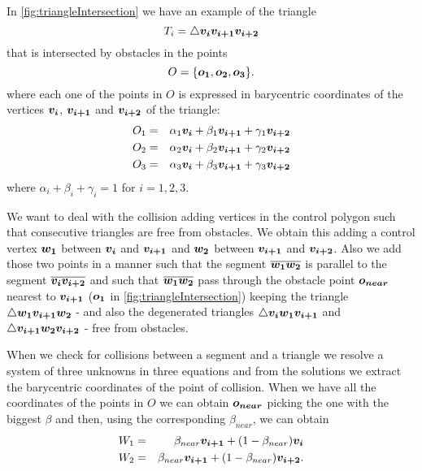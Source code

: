 \documentclass[dissertation.tex]{subfiles}
\begin{document}
In \cref{fig:triangleIntersection} we have an example of the triangle
\begin{equation*}
  T_i = \triangle \boldsymbol{v_i}\boldsymbol{v_{i+1}}\boldsymbol{v_{i+2}} 
\end{equation*}
that is
intersected by obstacles in the points
\begin{equation*}
  O = \{\boldsymbol{o_1},\boldsymbol{o_2},\boldsymbol{o_3}\}.
\end{equation*}
where each one of the points in $O$ is expressed in barycentric
coordinates of the vertices $\boldsymbol{v_i}$, $\boldsymbol{v_{i+1}}$ and $\boldsymbol{v_{i+2}}$ of the
triangle:
\begin{eqnarray*}
  O_1&=&\alpha_1 \boldsymbol{v_i}+\beta_1 \boldsymbol{v_{i+1}}+\gamma_1 \boldsymbol{v_{i+2}}\\
  O_2&=&\alpha_2 \boldsymbol{v_i}+\beta_2 \boldsymbol{v_{i+1}}+\gamma_2 \boldsymbol{v_{i+2}}\\
  O_3&=&\alpha_3 \boldsymbol{v_i}+\beta_3 \boldsymbol{v_{i+1}}+\gamma_3 \boldsymbol{v_{i+2}}
\end{eqnarray*}
where $\alpha_i+\beta_i+\gamma_i=1$ for $i=1,2,3$.

We want to deal with the collision adding vertices in the control
polygon such that consecutive triangles are free from obstacles. We
obtain this adding a control vertex $\boldsymbol{w_1}$ between $\boldsymbol{v_i}$ and $\boldsymbol{v_{i+1}}$
and $\boldsymbol{w_2}$ between $\boldsymbol{v_{i+1}}$ and $\boldsymbol{v_{i+2}}$. Also we add those two
points in a manner such that the segment $\overline{\boldsymbol{w_1}\boldsymbol{w_2}}$ is
parallel to the segment $\overline{\boldsymbol{v_i}\boldsymbol{v_{i+2}}}$ and such that
$\overline{\boldsymbol{w_1}\boldsymbol{w_2}}$ pass through the obstacle point $\boldsymbol{o_{near}}$ nearest
to $\boldsymbol{v_{i+1}}$ ($\boldsymbol{o_1}$ in \cref{fig:triangleIntersection}) keeping the
triangle $\triangle \boldsymbol{w_1}\boldsymbol{v_{i+1}}\boldsymbol{w_2}$ - and also
the degenerated triangles $\triangle \boldsymbol{v_i}\boldsymbol{w_1}\boldsymbol{v_{i+1}}$ and $\triangle
\boldsymbol{v_{i+1}}\boldsymbol{w_2}\boldsymbol{v_{i+2}}$ - free from obstacles.

When we check for collisions between a segment and a triangle we
resolve a system of three unknowns in
three equations and from the solutions we extract the barycentric
coordinates of
the point of collision. When we have all the coordinates of the points
in $O$ we can obtain $\boldsymbol{o_{near}}$ picking the one with the biggest $\beta$
and then, using the corresponding $\beta_{near}$, we can obtain
\begin{eqnarray*}
  W_1&=&\beta_{near} \boldsymbol{v_{i+1}}+(1-\beta_{near})\boldsymbol{v_i}\\
  W_2&=&\beta_{near} \boldsymbol{v_{i+1}}+(1-\beta_{near})\boldsymbol{v_{i+2}}.
\end{eqnarray*}
\end{document}

